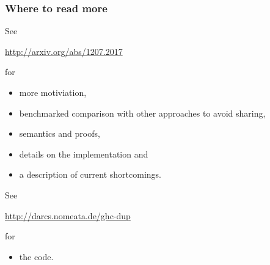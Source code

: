 \documentclass{beamer}
\begin{document}
\begin{frame}
\frametitle{Where to read more}
See\par {\centering\Large \url{http://arxiv.org/abs/1207.2017}\par} for
\begin{itemize}
\item more motiviation,
\item benchmarked comparison with other approaches to avoid sharing,
\item semantics and proofs,
\item details on the implementation and
\item a description of current shortcomings.
\end{itemize}
\vfill
See\par {\centering\Large \url{http://darcs.nomeata.de/ghc-dup}\par} for
\begin{itemize}
\item the code.
\end{itemize}

\end{frame}
\end{document}
